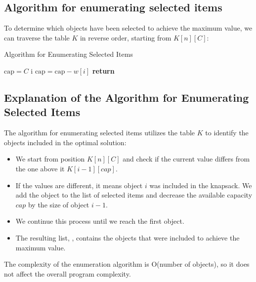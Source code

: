 \documentclass[a4paper,12pt]{article}
\begin{document}
\subsection{Algorithm for enumerating selected items}

To determine which objects have been selected to achieve the maximum value, we can traverse the table \( K \) in reverse order, starting from \( K[n][C] \):

\begin{algorithm}
\caption{Algorithm for Enumerating Selected Items}
\begin{algorithmic}[1]

\STATE {} 
\STATE \( \text{cap} = C \)
        \STATE {} i  
        \STATE \( \text{cap} = \text{cap} - w[i] \)
    \ENDIF
\ENDFOR
\STATE \textbf{return} 
\end{algorithmic}
\end{algorithm}

\subsection{Explanation of the Algorithm for Enumerating Selected Items}

The algorithm for enumerating selected items utilizes the table \( K \) to identify the objects included in the optimal solution:

\begin{itemize}
    \item We start from position \( K[n][C] \) and check if the current value differs from the one above it \( K[i-1][cap] \).
    \item If the values are different, it means object \( i \) was included in the knapsack. We add the object to the list of selected items and decrease the available capacity \( cap \) by the size of object \( i-1 \).
    \item We continue this process until we reach the first object.
    \item The resulting list, , contains the objects that were included to achieve the maximum value.
\end{itemize}

The complexity of the enumeration algorithm is O(number of objects), so it does not affect the overall program complexity.
\end{document}
